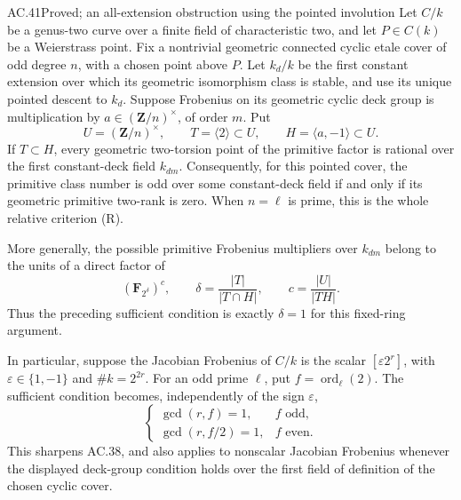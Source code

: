 \begin{claim}{AC.41}{Proved; an all-extension obstruction using the pointed involution}
Let $C/k$ be a genus-two curve over a finite field of
characteristic two, and let $P\in C(k)$ be a Weierstrass
point. Fix a nontrivial geometric connected cyclic etale
cover of odd degree $n$, with a chosen point above $P$.
Let $k_d/k$ be the first constant extension over which
its geometric isomorphism class is stable, and use its
unique pointed descent to $k_d$. Suppose Frobenius on
its geometric cyclic deck group is multiplication by
$a\in(\mathbf Z/n)^\times$, of order $m$. Put
\[
 U=(\mathbf Z/n)^\times,\qquad
 T=\langle2\rangle\subset U,\qquad
 H=\langle a,-1\rangle\subset U.
\]
If $T\subset H$, every geometric two-torsion point of
the primitive factor is rational over the first
constant-deck field $k_{dm}$. Consequently, for this
pointed cover, the primitive class number is odd over
some constant-deck field if and only if its geometric
primitive two-rank is zero. When $n=\ell$ is prime,
this is the whole relative criterion \textup{(R)}.

More generally, the possible primitive Frobenius
multipliers over $k_{dm}$ belong to the units of a
direct factor of
\[
 \left(\mathbf F_{2^{\delta}}\right)^c,
 \qquad
 \delta=\frac{|T|}{|T\cap H|},\qquad
 c=\frac{|U|}{|TH|}.                              \tag{AC.41.1}
\]
Thus the preceding sufficient condition is exactly
$\delta=1$ for this fixed-ring argument.

In particular, suppose the Jacobian Frobenius of $C/k$
is the scalar $[\varepsilon2^r]$, with
$\varepsilon\in\{1,-1\}$ and $\#k=2^{2r}$.
For an odd prime $\ell$, put $f=\operatorname{ord}_\ell(2)$.
The sufficient condition becomes, independently of the
sign $\varepsilon$,
\[
 \begin{cases}
  \gcd(r,f)=1,&f\text{ odd},\\
  \gcd(r,f/2)=1,&f\text{ even}.
 \end{cases}                                      \tag{AC.41.2}
\]
This sharpens AC.38, and also applies to nonscalar
Jacobian Frobenius whenever the displayed deck-group
condition holds over the first field of definition of
the chosen cyclic cover.
\end{claim}
